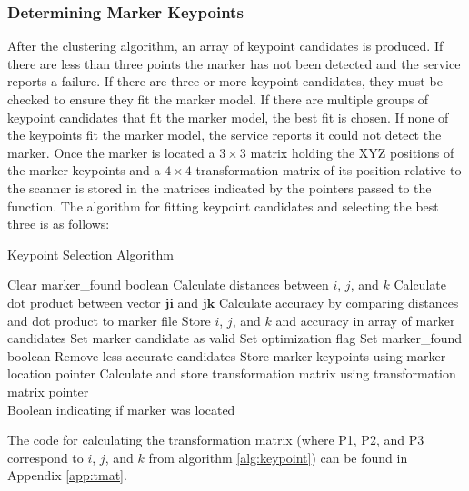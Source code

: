 \subsubsection{Determining Marker Keypoints}
After the clustering algorithm, an array of keypoint candidates is produced. If there are less than three points the marker has not been detected and the service reports a failure. If there are three or more keypoint candidates, they must be checked to ensure they fit the marker model. If there are multiple groups of keypoint candidates that fit the marker model, the best fit is chosen. If none of the keypoints fit the marker model, the service reports it could not detect the marker. Once the marker is located a $3\times3$ matrix holding the XYZ positions of the marker keypoints and a $4\times4$ transformation matrix of its position relative to the scanner is stored in the matrices indicated by the pointers passed to the function. The algorithm for fitting keypoint candidates and selecting the best three is as follows:
\begin{spacing}{0.8}
\begin{algorithm}[H]
\caption{Keypoint Selection Algorithm}
\label{alg:keypoint}
\begin{algorithmic}[1]
\begin{raggedright}
\State Clear marker\_found boolean
\State Calculate distances between $i$, $j$, and $k$
\State Calculate dot product between vector $\mathbf{ji}$ and $\mathbf{jk}$
\State Calculate accuracy by comparing distances and dot product to marker file
\State Store $i$, $j$, and $k$ and accuracy in array of marker candidates
\State Set marker candidate as valid
\State Set optimization flag
\EndIf
\EndIf
\EndIf
\EndFor
\EndFor
\EndFor
{}
\State Set marker\_found boolean
\State Remove less accurate candidates
\State Store marker keypoints using marker location pointer 
\State Calculate and store transformation matrix using transformation matrix pointer \
\EndIf
\EndFunction\\
\Return Boolean indicating if marker was located
\end{raggedright}
\end{algorithmic}
\end{algorithm}
\end{spacing}
The code for calculating the transformation matrix (where P1, P2, and P3 correspond to $i$, $j$, and $k$ from algorithm \ref{alg:keypoint}) can be found in Appendix \ref{app:tmat}.\\

